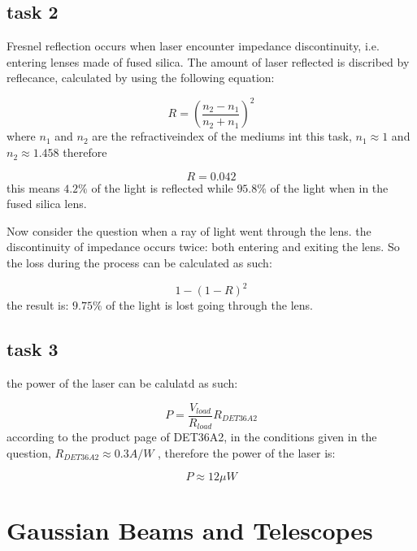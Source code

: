 \documentclass{article}
\begin{document}
\subsection{task 2}
{Fresnel reflection occurs when laser encounter impedance discontinuity, i.e. entering lenses made of fused silica. The amount of 
laser reflected is discribed by reflecance, calculated by using the following equation:}\par
$$
R=(\frac{n_{2}-n_1}{n_2+n_1})^2
$$
{where $n_1$ and $n_2$ are the refractiveindex of the mediums int this task, $n_1\approx 1$ and $n_2\approx 1.458$
therefore}\par
$$R=0.042$$
{this means $4.2\% $ of the light is reflected while $95.8\% $ of the light when in the fused silica lens.}\par
{Now consider the question when a ray of light went through the lens. the discontinuity of impedance occurs twice: both entering 
and exiting the lens. So the loss during the process can be calculated as such:}\par
$$
1-(1-R)^2
$$
{the result is: $9.75\% $ of the light is lost going through the lens.}\par

\subsection{task 3}
{the power of the laser can be calulatd as such:}\par
$$
P=\frac{V_{load}}{R_{load}}R_{DET36A2}
$$
{according to the product page of DET36A2, in the conditions given in the question, $R_{DET36A2}\approx 0.3A/W $ \cite{DET36A2}, 
therefore the power of the laser is:}\par
$$
P \approx 12 \mu W
$$

\section{Gaussian Beams and Telescopes}
\end{document}
